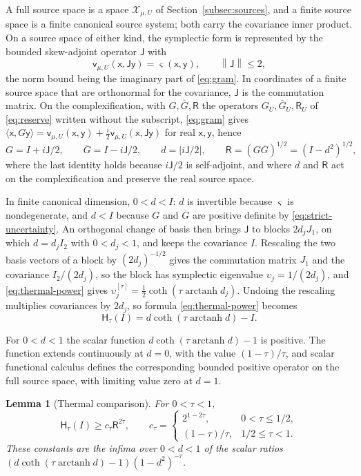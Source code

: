 \documentclass[11pt]{amsart}
\numberwithin{equation}{section}
\newtheorem{lemma}[theorem]{Lemma}
\theoremstyle{definition}
\newcommand{\vv}{\mathsf v}
\newcommand{\Res}{\mathsf R}
\newcommand{\Therm}{\mathsf H}
\newcommand{\sx}{\mathsf x}
\newcommand{\sy}{\mathsf y}
\newcommand{\arctanh}{\operatorname{arctanh}}
\newcommand{\norm}[1]{\left\|#1\right\|}
\newcommand{\ip}[2]{\langle #1,#2\rangle}
\begin{document}
A full source space is a space \(\mathcal X_{\mu,U}\) of
Section~\ref{subsec:sources}, and a finite source space is a finite
canonical source system; both carry the covariance inner product. On a
source space of either kind, the symplectic
form is represented by the bounded skew-adjoint operator \(\mathsf J\)
with
\[
 \vv_{\mu,U}(\sx,\mathsf J\sy)=\varsigma(\sx,\sy),
 \qquad \norm{\mathsf J}\le2,
\]
the norm bound being the imaginary part of \eqref{eq:gram}. In coordinates
of a finite source space that are orthonormal for the covariance,
\(\mathsf J\) is the commutation matrix. On the complexification, with
\(G,\overline G,\Res\) the operators \(G_U,\overline G_U,\Res_U\) of
\eqref{eq:reserve} written without the subscript, \eqref{eq:gram} gives
\(\ip{\sx}{G\sy}=\vv_{\mu,U}(\sx,\sy)+\frac i2\vv_{\mu,U}(\sx,\mathsf J\sy)\)
for real \(\sx,\sy\), hence
\[
 G=I+i\mathsf J/2,\qquad
 \overline G=I-i\mathsf J/2,\qquad
 d=|i\mathsf J/2|,\qquad
 \Res=(G\overline G)^{1/2}=(I-d^2)^{1/2},
\]
where the last identity holds because \(i\mathsf J/2\) is self-adjoint,
and where \(d\) and \(\Res\) act on the complexification and preserve
the real source space.

In finite canonical dimension, \(0<d<I\): \(d\) is invertible because \(\varsigma\) is
nondegenerate, and \(d<I\) because \(G\) and \(\overline G\) are positive
definite by \eqref{eq:strict-uncertainty}. An
orthogonal change of basis then brings \(\mathsf J\) to blocks
\(2d_jJ_1\), on which \(d=d_jI_2\) with \(0<d_j<1\), and keeps the
covariance \(I\). Rescaling the two basis vectors of a block by
\((2d_j)^{-1/2}\) gives the commutation matrix \(J_1\) and the
covariance \(I_2/(2d_j)\), so the block has symplectic eigenvalue
\(\upsilon_j=1/(2d_j)\), and \eqref{eq:thermal-power} gives
\(\upsilon_j^{[\tau]}=\frac12\coth(\tau\arctanh d_j)\). Undoing the
rescaling multiplies covariances by \(2d_j\), so formula
\eqref{eq:thermal-power} becomes
\[
 \Therm_\tau(I)=d\coth(\tau\arctanh d)-I.
\]

For \(0<d<1\) the scalar function \(d\coth(\tau\arctanh d)-1\) is positive.
The function extends continuously at \(d=0\), with the value \((1-\tau)/\tau\),
and scalar functional
calculus defines the corresponding bounded positive operator on the
full source space, with limiting value zero at \(d=1\).

\begin{lemma}[Thermal comparison]\label{lem:thermal-comparison}
For \(0<\tau<1\),
\begin{equation}
 \Therm_\tau(I)\ge c_\tau\Res^{2\tau},\qquad
 c_\tau=
 \begin{cases}
  2^{1-2\tau},&0<\tau\le1/2,\\
  (1-\tau)/\tau,&1/2\le\tau<1.
 \end{cases}
 \label{eq:scalar-reserve}
\end{equation}
These constants are the infima over \(0<d<1\) of the scalar ratios
\((d\coth(\tau\arctanh d)-1)(1-d^2)^{-\tau}\).
\end{lemma}
\end{document}
